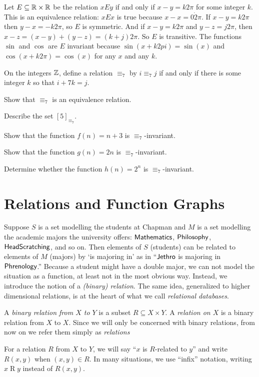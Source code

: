 \begin{example}
	Let $E\subseteq \mathbb R\times \mathbb R$ be the relation $xEy$ if and only if $x-y = k2\pi$ for some integer $k$. This is an equivalence relation:
	$xEx$ is true because $x-x=0\dot2\pi$. If $x-y=k2\pi$ then $y-x=-k2\pi$, so
	 $E$ is symmetric. And if $x-y=k2\pi$ and $y-z=j2\pi$, then $x-z = (x-y)+(y-z) = (k+j)2\pi$. So $E$ is transitive. The functions $\sin$ and $\cos$ are $E$ invariant because $\sin(x + k2pi) = \sin(x)$ and $\cos(x + k2\pi) = \cos(x)$ for any $x$ and any $k$. 
\end{example}

\begin{exercises}
	On the integers $\mathbb Z$, define a relation $\equiv_7$ by $i \equiv_7 j$ if and only if there is some integer $k$ so that $i +7k = j$.
	\begin{nextexercise}
		\item Show that $\equiv_7$ is an equivalence relation.
		\item Describe the set $[5]_{\equiv_7}$.
		\item Show that the function $f(n) = n+3$ is $\equiv_7$-invariant.
		\item Show that the function $g(n) = 2n$ is $\equiv_7$-invariant.
		\item Determine whether the function $h(n) = 2^n$ is $\equiv_7$-invariant.
	\end{nextexercise}
\end{exercises}

\section{Relations and Function Graphs}

Suppose $S$ is a set modelling the students at Chapman and $M$ is a set modelling the academic majors the university offers: ${\mathord{\textsf{Mathematics}}}$, ${\mathord{\textsf{Philosophy}}}$, ${\mathord{\textsf{HeadScratching}}}$, and so on. Then elements of $S$ (students) can be related to elements of $M$ (majors) by `is majoring in' as in
``${\mathord{\textsf{Jethro}}}$ is majoring in ${\mathord{\textsf{Phrenology}}}$.'' 
Because a student might have a double major, we can not model the situation as a function, at least not in the most obvious way. 
Instead, we introduce the notion of a \emph{(binary) relation}. 
The same idea, generalized to higher dimensional relations, is at the heart of what we call \emph{relational databases}. 

\begin{defn}
	A \emph{binary relation from $X$ to $Y$} is a subset $R\subseteq X\times Y$.
	A \emph{relation on $X$} is a binary relation from $X$ to $X$. 
	Since we will only be concerned with binary relations, from now on we refer them simply as \emph{relations}
	
	For a relation $R$ from $X$ to $Y$, we will say ``$x$ is $R$-related to $y$'' and write $R(x,y)$ when $(x,y)\in R$. 
	In many situations, we use ``infix'' notation, writing $x\mathrel{R}y$ instead of $R(x,y)$.
\end{defn}

